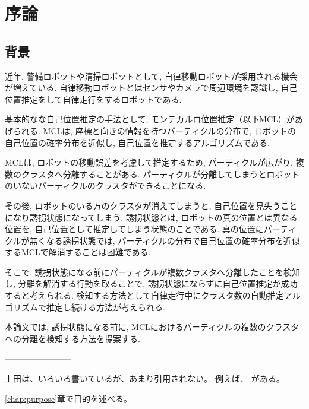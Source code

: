 \chapter{序論}
\section{背景}
近年, 警備ロボットや清掃ロボットとして, 自律移動ロボットが採用される機会が増えている. 
自律移動ロボットとはセンサやカメラで周辺環境を認識し, 自己位置推定をして自律走行をするロボットである. 

基本的なな自己位置推定の手法として, モンテカルロ位置推定（以下MCL）があげられる. 
MCLは, 座標と向きの情報を持つパーティクルの分布で, ロボットの自己位置の確率分布を近似し, 自己位置を推定するアルゴリズムである.

MCLは, ロボットの移動誤差を考慮して推定するため, パーティクルが広がり, 複数のクラスタへ分離することがある. 
パーティクルが分離してしまうとロボットのいないパーティクルのクラスタができることになる. 

その後, ロボットのいる方のクラスタが消えてしまうと, 自己位置を見失うことになり誘拐状態になってしまう. 
誘拐状態とは, ロボットの真の位置とは異なる位置を, 自己位置として推定してしまう状態のことである.
真の位置にパーティクルが無くなる誘拐状態では, パーティクルの分布で自己位置の確率分布を近似するMCLで解消することは困難である. 

そこで, 誘拐状態になる前にパーティクルが複数クラスタへ分離したことを検知し, 分離を解消する行動を取ることで, 誘拐状態にならずに自己位置推定が成功すると考えられる. 
検知する方法として自律走行中にクラスタ数の自動推定アルゴリズムで推定し続ける方法が考えられる. 

本論文では, 誘拐状態になる前に, MCLにおけるパーティクルの複数のクラスタへの分離を検知する方法を提案する. 









------------------------


上田は、いろいろ書いているが、あまり引用されない。
例えば、\cite{上田2015gihyo,ueda2015,上田2015jsai}
がある。

\ref{chap:purpose}章で目的を述べる。

%
